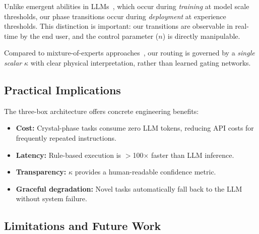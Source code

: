 \documentclass[10pt,twocolumn]{article}
\newcommand{\kap}{\kappa}
\begin{document}
Unlike emergent abilities in LLMs~\cite{wei2022}, which 
occur during \textit{training} at model scale thresholds, 
our phase transitions occur during \textit{deployment} at 
experience thresholds. This distinction is important: our 
transitions are observable in real-time by the end user, 
and the control parameter ($n$) is directly manipulable.

Compared to mixture-of-experts approaches~\cite{shazeer2017}, 
our routing is governed by a \textit{single scalar} $\kap$ 
with clear physical interpretation, rather than learned 
gating networks.

\subsection{Practical Implications}

The three-box architecture offers concrete engineering 
benefits:
\begin{itemize}[leftmargin=*, itemsep=2pt]
  \item \textbf{Cost:} Crystal-phase tasks consume zero LLM 
    tokens, reducing API costs for frequently repeated 
    instructions.
  \item \textbf{Latency:} Rule-based execution is 
    $>$100$\times$ faster than LLM inference.
  \item \textbf{Transparency:} $\kap$ provides a 
    human-readable confidence metric.
  \item \textbf{Graceful degradation:} Novel tasks 
    automatically fall back to the LLM without system 
    failure.
\end{itemize}

\subsection{Limitations and Future Work}
\end{document}
